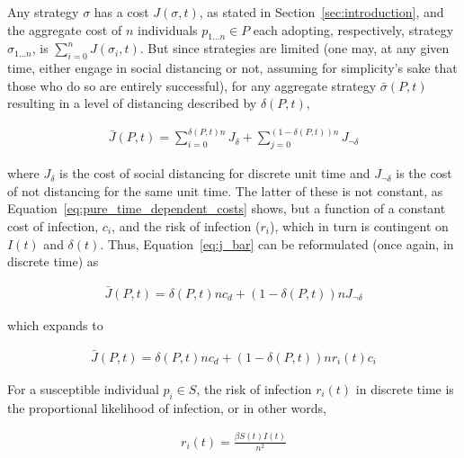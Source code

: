 \documentclass[12pt]{article}
\begin{document}
Any strategy $\sigma$ has a cost $J(\sigma, t)$, as stated in Section~\ref{sec:introduction}, and the aggregate cost of $n$ individuals $p_{1 \ldots n} \in P$ each adopting, respectively, strategy $\sigma_{1 \ldots n}$, is $\sum_{i=0}^n J(\sigma_i, t)$. But since strategies are limited (one may, at any given time, either engage in social distancing or not, assuming for simplicity's sake that those who do so are entirely successful), for any aggregate strategy $\bar{\sigma} (P, t)$ resulting in a level of distancing described by $\delta (P, t)$, 

\begin{equation}
	\begin{aligned}
		\bar{J}(P, t) = \sum_{i=0}^{\delta(P, t) n} J_{\delta} + \sum_{j=0}^{(1-\delta(P, t)) n} J_{\lnot \delta}
	\end{aligned}
	\label{eq:j_bar}
\end{equation}

\noindent where $J_{\delta}$ is the cost of social distancing for discrete unit time and $J_{\lnot \delta}$ is the cost of not distancing for the same unit time. The latter of these is not constant, as Equation~\eqref{eq:pure_time_dependent_costs} shows, but a function of a constant cost of infection, $c_i$, and the risk of infection ($r_i$), which in turn is contingent on $I(t)$ and $\delta(t)$. Thus, Equation~\eqref{eq:j_bar} can be reformulated (once again, in discrete time) as

\begin{equation}
	\begin{aligned}
		\bar{J}(P, t) = \delta(P, t) n c_d + (1 - \delta(P, t)) n J_{\lnot \delta}
	\end{aligned}
\end{equation}

\noindent which expands to

\begin{equation}
	\begin{aligned}
		\bar{J}(P, t) = \delta(P, t) n c_d + (1 - \delta(P, t)) n r_i(t) c_i
	\end{aligned}
\end{equation}

For a susceptible individual $p_i \in S$, the risk of infection $r_i(t)$ in discrete time is the proportional likelihood of infection, or in other words, 

\begin{equation}
	\begin{aligned}
		r_i(t) = \frac{\beta S(t) I(t)}{n^2}
	\end{aligned}
\end{equation}
\end{document}
